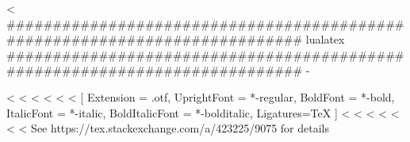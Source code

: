 <%
###########################################################################
lualatex
###########################################################################
-%
\usepackage[no-math]{fontspec}
\usepackage{unicode-math}

<%
<%
<%
\setmainfont[Ligatures=TeX]{Arial}
\setsansfont[Ligatures=TeX]{Arial}
\setmonofont[StylisticSet={1,3}]{Inconsolatazi4}
<%
<%
<%
\setmainfont{texgyretermes}[
  Extension = .otf,
  UprightFont = *-regular,
  BoldFont = *-bold,
  ItalicFont = *-italic,
  BoldItalicFont = *-bolditalic,
  Ligatures=TeX
]
\setsansfont[Scale=.9]{TeX Gyre Heros Regular}
<%
\setmonofont{Latin Modern Mono} %
<%
<%
\setmonofont[StylisticSet={1,3},Scale=.9]{Inconsolatazi4}
<%
<%
<%
<%
    See https://tex.stackexchange.com/a/423225/9075 for details
